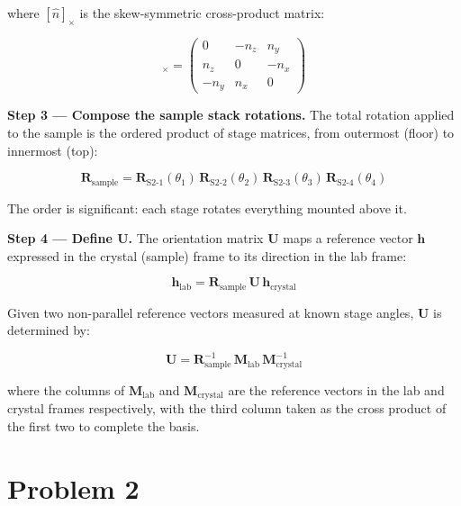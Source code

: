 \documentclass[12pt]{article}
\begin{document}
where $[\hat{n}]_\times$ is the skew-symmetric cross-product matrix:

\begin{equation}
  [\hat{n}]_\times =
  \begin{pmatrix}
     0   & -n_z &  n_y \\
     n_z &  0   & -n_x \\
    -n_y &  n_x &  0
  \end{pmatrix}
\end{equation}

\textbf{Step 3 --- Compose the sample stack rotations.}
The total rotation applied to the sample is the ordered product of stage matrices,
from outermost (floor) to innermost (top):

\begin{equation}
  \mathbf{R}_\text{sample}
  = \mathbf{R}_\text{S2-1}(\theta_1)\,
    \mathbf{R}_\text{S2-2}(\theta_2)\,
    \mathbf{R}_\text{S2-3}(\theta_3)\,
    \mathbf{R}_\text{S2-4}(\theta_4)
\end{equation}

The order is significant: each stage rotates everything mounted above it.

\textbf{Step 4 --- Define \textbf{U}.}
The orientation matrix $\mathbf{U}$ maps a reference vector $\mathbf{h}$ expressed
in the crystal (sample) frame to its direction in the lab frame:

\begin{equation}
  \mathbf{h}_\text{lab} = \mathbf{R}_\text{sample}\,\mathbf{U}\,\mathbf{h}_\text{crystal}
\end{equation}

Given two non-parallel reference vectors measured at known stage angles, $\mathbf{U}$
is determined by:

\begin{equation}
  \mathbf{U}
  = \mathbf{R}_\text{sample}^{-1}\,
    \mathbf{M}_\text{lab}\,
    \mathbf{M}_\text{crystal}^{-1}
\end{equation}

where the columns of $\mathbf{M}_\text{lab}$ and $\mathbf{M}_\text{crystal}$ are the
reference vectors in the lab and crystal frames respectively, with the third column
taken as the cross product of the first two to complete the basis.

\section*{Problem 2}
\end{document}
